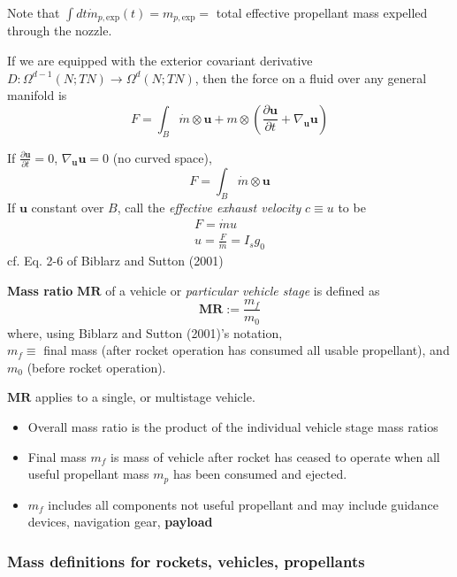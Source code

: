 \documentclass[10pt]{amsart}
\begin{document}
\begin{multicols*}{2}
Note that $\int dt \dot{m}_{p, \text{exp}}(t) = m_{p, \text{exp}} = $ total effective propellant mass expelled through the nozzle.

If we are equipped with the exterior covariant derivative $D: \Omega^{d-1}(N; TN) \to \Omega^d(N; TN)$, then the force on a fluid over any general manifold is 
\[
F = \int_B \dot{m} \otimes \mathbf{u} + m \otimes \left( \frac{\partial \mathbf{u}}{ \partial t} + \nabla_{\mathbf{u}} \mathbf{u} \right) 
\]

If $\frac{\partial \mathbf{u}}{ \partial t} = 0$, $\nabla_{\mathbf{u}} \mathbf{u} = 0$ (no curved space),
\[
F = \int_B \dot{m} \otimes \mathbf{u}
\]
If $\mathbf{u}$ constant over $B$, call the \emph{effective exhaust velocity} $c \equiv u$ to be
\begin{equation}\label{Eq:ConstantEffectiveExhaustVelocity}
\begin{gathered}
F = \dot{m} u  \\
u = \frac{F}{\dot{m}} = I_s g_0
\end{gathered} 
\end{equation}
cf. Eq. 2-6 of Biblarz and Sutton (2001) \cite{GSuttonOBiblarz2001}

\textbf{Mass ratio} $\mathbf{MR}$ of a vehicle or \emph{particular vehicle stage} is defined as 
\[
\mathbf{MR} := \frac{m_f}{m_0}
\]
where, using Biblarz and Sutton (2001)'s notation, \\
$m_f \equiv $ final mass (after rocket operation has consumed all usable propellant), and \\
$m_0$ (before rocket operation).

$\mathbf{MR}$ applies to a single, or multistage vehicle.
\begin{itemize}
	\item Overall mass ratio is the product of the individual vehicle stage mass ratios
	\item Final mass $m_f$ is mass of vehicle after rocket has ceased to operate when all useful propellant mass $m_p$ has been consumed and ejected. 
	\item $m_f$ includes all components not useful propellant and may include guidance devices, navigation gear, \textbf{payload}
	\end{itemize} 

\subsubsection{Mass definitions for rockets, vehicles, propellants}


\end{multicols*}
\end{document}
